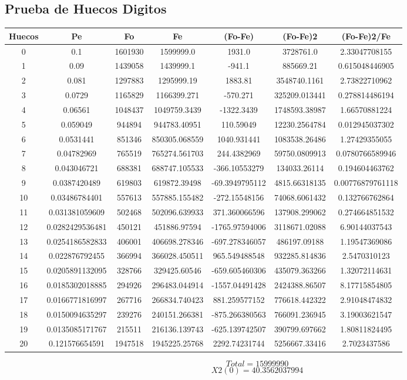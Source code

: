 \documentclass{article}
\begin{document}
\subsection{Prueba de Huecos Digitos}
\begin{tabular}{|c|c|c|c|c|c|c|}
Huecos&Pe&Fo&Fe&(Fo{-}Fe)&(Fo{-}Fe)2&(Fo{-}Fe)2/Fe\\
\hline
0&0.1&1601930&1599999.0&1931.0&3728761.0&2.33047708155\\
\hline
1&0.09&1439058&1439999.1&{-}941.1&885669.21&0.615048446905\\
\hline
2&0.081&1297883&1295999.19&1883.81&3548740.1161&2.73822710962\\
\hline
3&0.0729&1165829&1166399.271&{-}570.271&325209.013441&0.278814486194\\
\hline
4&0.06561&1048437&1049759.3439&{-}1322.3439&1748593.38987&1.66570881224\\
\hline
5&0.059049&944894&944783.40951&110.59049&12230.2564784&0.012945037302\\
\hline
6&0.0531441&851346&850305.068559&1040.931441&1083538.26486&1.27429355055\\
\hline
7&0.04782969&765519&765274.561703&244.4382969&59750.0809913&0.0780766589946\\
\hline
8&0.043046721&688381&688747.105533&{-}366.10553279&134033.26114&0.194604463762\\
\hline
9&0.0387420489&619803&619872.39498&{-}69.3949795112&4815.66318135&0.00776879761118\\
\hline
10&0.03486784401&557613&557885.155482&{-}272.15548156&74068.6061432&0.132766762864\\
\hline
11&0.031381059609&502468&502096.639933&371.360066596&137908.299062&0.274664851532\\
\hline
12&0.0282429536481&450121&451886.97594&{-}1765.97594006&3118671.02088&6.90144037543\\
\hline
13&0.0254186582833&406001&406698.278346&{-}697.278346057&486197.09188&1.19547369086\\
\hline
14&0.022876792455&366994&366028.450511&965.549488548&932285.814836&2.5470310123\\
\hline
15&0.0205891132095&328766&329425.60546&{-}659.605460306&435079.363266&1.32072114631\\
\hline
16&0.0185302018885&294926&296483.044914&{-}1557.04491428&2424388.86507&8.17715854805\\
\hline
17&0.0166771816997&267716&266834.740423&881.259577152&776618.442322&2.91048474832\\
\hline
18&0.0150094635297&239276&240151.266381&{-}875.266380563&766091.236945&3.19003621547\\
\hline
19&0.0135085171767&215511&216136.139743&{-}625.139742507&390799.697662&1.80811824495\\
\hline
20&0.121576654591&1947518&1945225.25768&2292.74231744&5256667.33416&2.7023437586\\
\end{tabular}
$$
Total = 15999990
$$
$$
X2(0) = 40.3562037994
$$
\end{document}
